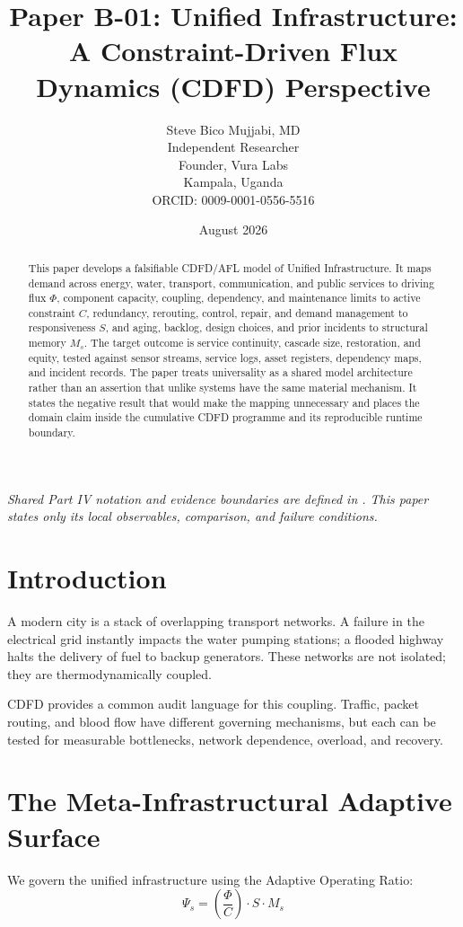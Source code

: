 \documentclass[11pt,a4paper]{article}
\title{\textbf{Paper B-01: Unified Infrastructure:\\ A Constraint-Driven Flux Dynamics (CDFD) Perspective}}
\author{Steve Bico Mujjabi, MD\\
\small Independent Researcher\\
\small Founder, Vura Labs\\
\small Kampala, Uganda\\
\small ORCID: 0009-0001-0556-5516}
\date{August 2026}
\begin{document}
\maketitle

\noindent\textit{Shared Part IV notation and evidence boundaries are defined in . This paper states only its local observables, comparison, and failure conditions.}


\begin{abstract}
This paper develops a falsifiable CDFD/AFL model of Unified Infrastructure. It maps demand across energy, water, transport, communication, and public services to driving flux $\Phi$, component capacity, coupling, dependency, and maintenance limits to active constraint $C$, redundancy, rerouting, control, repair, and demand management to responsiveness $S$, and aging, backlog, design choices, and prior incidents to structural memory $M_s$. The target outcome is service continuity, cascade size, restoration, and equity, tested against sensor streams, service logs, asset registers, dependency maps, and incident records. The paper treats universality as a shared model architecture rather than an assertion that unlike systems have the same material mechanism. It states the negative result that would make the mapping unnecessary and places the domain claim inside the cumulative CDFD programme and its reproducible runtime boundary.
\end{abstract}

\section{Introduction}

A modern city is a stack of overlapping transport networks. A failure in the electrical grid instantly impacts the water pumping stations; a flooded highway halts the delivery of fuel to backup generators. These networks are not isolated; they are thermodynamically coupled.

CDFD provides a common audit language for this coupling. Traffic, packet routing, and blood flow have different governing mechanisms, but each can be tested for measurable bottlenecks, network dependence, overload, and recovery.

\section{The Meta-Infrastructural Adaptive Surface}
We govern the unified infrastructure using the Adaptive Operating Ratio:
\begin{equation}
    \Psi_s = \left( \frac{\Phi}{C} \right) \cdot S \cdot M_s
\end{equation}
\end{document}
